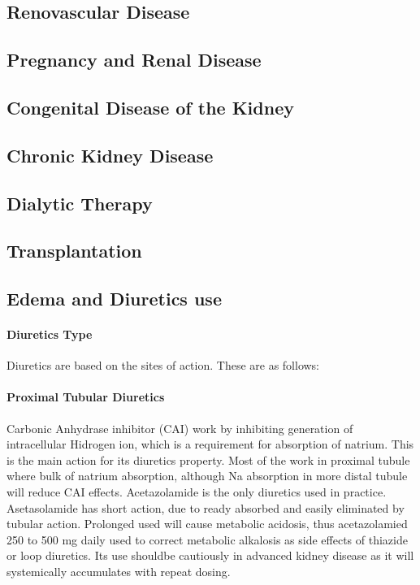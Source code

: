 \documentclass[
  letterpaper,
  DIV=11,
  numbers=noendperiod]{scrreprt}
\let\oldparagraph\paragraph
\renewcommand{\paragraph}[1]{\oldparagraph{#1}\mbox{}}
\begin{document}
\subsection{Renovascular Disease}\label{renovascular-disease}

\subsection{Pregnancy and Renal
Disease}\label{pregnancy-and-renal-disease}

\subsection{Congenital Disease of the
Kidney}\label{congenital-disease-of-the-kidney}

\subsection{Chronic Kidney Disease}\label{chronic-kidney-disease}

\subsection{Dialytic Therapy}\label{dialytic-therapy}

\subsection{Transplantation}\label{transplantation}

\subsection{Edema and Diuretics use}\label{edema-and-diuretics-use}

\paragraph{Diuretics Type}\label{diuretics-type}

Diuretics are based on the sites of action. These are as follows:

\paragraph{Proximal Tubular Diuretics}\label{proximal-tubular-diuretics}

Carbonic Anhydrase inhibitor (CAI) work by inhibiting generation of
intracellular Hidrogen ion, which is a requirement for absorption of
natrium. This is the main action for its diuretics property. Most of the
work in proximal tubule where bulk of natrium absorption, although Na
absorption in more distal tubule will reduce CAI effects. Acetazolamide
is the only diuretics used in practice. Asetasolamide has short action,
due to ready absorbed and easily eliminated by tubular action. Prolonged
used will cause metabolic acidosis, thus acetazolamied 250 to 500 mg
daily used to correct metabolic alkalosis as side effects of thiazide or
loop diuretics. Its use shouldbe cautiously in advanced kidney disease
as it will systemically accumulates with repeat dosing.
\end{document}
